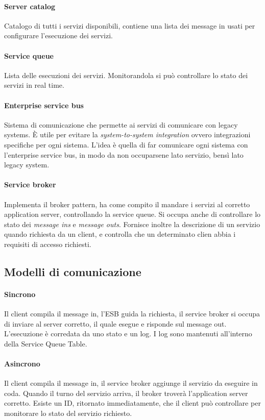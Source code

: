 \paragraph{Server catalog}
Catalogo di tutti i servizi disponibili, contiene una lista dei message in usati 
per configurare l'esecuzione dei servizi.

\paragraph{Service queue}
Lista delle esecuzioni dei servizi. Monitorandola si può controllare lo stato dei 
servizi in real time.

\paragraph{Enterprise service bus}
Sistema di comunicazione che permette ai servizi di comunicare con legacy systems.
È utile per evitare la \emph{system-to-system integration} ovvero integrazioni specifiche
per ogni sistema. L'idea è quella di far comunicare ogni sistema con l'enterprise 
service bus, in modo da non occuparsene lato servizio, bensì lato legacy system.

\paragraph{Service broker}
Implementa il broker pattern, ha come compito il mandare 
i servizi al corretto application server, controllando la service queue.
Si occupa anche di controllare lo stato dei \emph{message ins} e \emph{message outs}.
Fornisce inoltre la descrizione di un servizio quando richiesta da un client, 
e controlla che un determinato clien abbia i requisiti di accesso richiesti.

\subsection{Modelli di comunicazione}
\paragraph{Sincrono}
Il client compila il message in, l'ESB guida la richiesta, il service broker si occupa di 
inviare al server corretto, il quale esegue e risponde sul message out. L'esecuzione
è corredata da uno stato e un log. I log sono mantenuti all'interno della Service Queue Table.

\paragraph{Asincrono}
Il client compila il message in, il service broker aggiunge il servizio da eseguire in 
coda. Quando il turno del servizio arriva, il broker troverà l'application server corretto.
Esiste un ID, ritornato immediatamente, che il client può controllare per monitorare lo stato del servizio 
richiesto.

